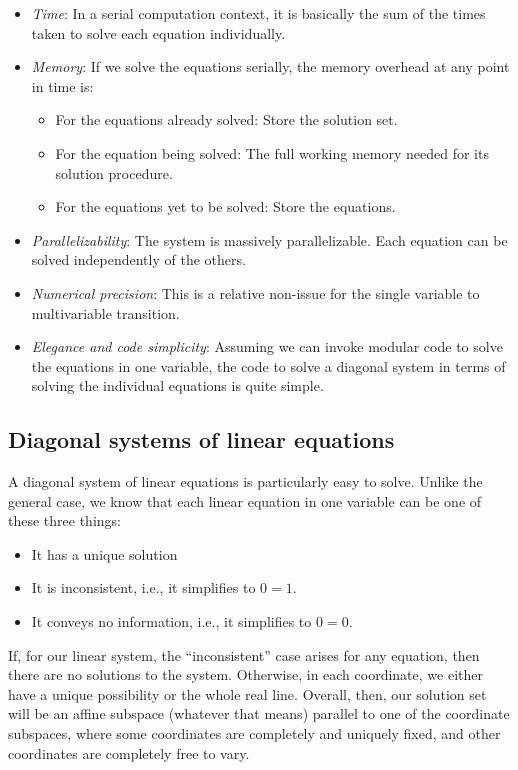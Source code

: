 \documentclass[10pt]{amsart}
\begin{document}
\begin{itemize}
\item {\em Time}: In a serial computation context, it is basically the
  sum of the times taken to solve each equation individually.
\item {\em Memory}: If we solve the equations serially, the memory
  overhead at any point in time is:

  \begin{itemize}
  \item For the equations already solved: Store the solution set.
  \item For the equation being solved: The full working memory needed for its solution procedure.
  \item For the equations yet to be solved: Store the equations.
  \end{itemize}
\item {\em Parallelizability}: The system is massively
  parallelizable. Each equation can be solved independently of the
  others.
\item {\em Numerical precision}: This is a relative non-issue for the
  single variable to multivariable transition.
\item {\em Elegance and code simplicity}: Assuming we can invoke
  modular code to solve the equations in one variable, the code to
  solve a diagonal system in terms of solving the individual equations
  is quite simple.
\end{itemize}

\subsection{Diagonal systems of linear equations}

A diagonal system of linear equations is particularly easy to
solve. Unlike the general case, we know that each linear equation in
one variable can be one of these three things:

\begin{itemize}
\item It has a unique solution
\item It is inconsistent, i.e., it simplifies to $0 = 1$.
\item It conveys no information, i.e., it simplifies to $0 = 0$.
\end{itemize}

If, for our linear system, the ``inconsistent'' case arises for any
equation, then there are no solutions to the system. Otherwise, in
each coordinate, we either have a unique possibility or the whole real
line. Overall, then, our solution set will be an affine subspace
(whatever that means) parallel to one of the coordinate subspaces,
where some coordinates are completely and uniquely fixed, and other
coordinates are completely free to vary.
\end{document}

